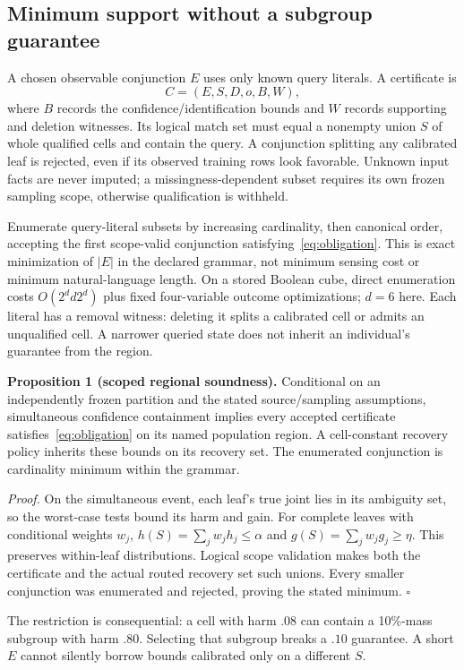 \documentclass[conference]{IEEEtran}
\begin{document}
\subsection{Minimum support without a subgroup guarantee}
A chosen observable conjunction $E$ uses only known query literals. A certificate is
\begin{equation}
 C=(E,S,D,o,B,W),\label{eq:certificate}
\end{equation}
where $B$ records the confidence/identification bounds and $W$ records supporting and deletion witnesses. Its logical match set must equal a nonempty union $S$ of whole qualified cells and contain the query. A conjunction splitting any calibrated leaf is rejected, even if its observed training rows look favorable. Unknown input facts are never imputed; a missingness-dependent subset requires its own frozen sampling scope, otherwise qualification is withheld.

Enumerate query-literal subsets by increasing cardinality, then canonical order, accepting the first scope-valid conjunction satisfying~\eqref{eq:obligation}. This is exact minimization of $|E|$ in the declared grammar, not minimum sensing cost or minimum natural-language length. On a stored Boolean cube, direct enumeration costs $O(2^d d2^d)$ plus fixed four-variable outcome optimizations; $d=6$ here. Each literal has a removal witness: deleting it splits a calibrated cell or admits an unqualified cell. A narrower queried state does not inherit an individual's guarantee from the region.

\textbf{Proposition 1 (scoped regional soundness).} Conditional on an independently frozen partition and the stated source/sampling assumptions, simultaneous confidence containment implies every accepted certificate satisfies~\eqref{eq:obligation} on its named population region. A cell-constant recovery policy inherits these bounds on its recovery set. The enumerated conjunction is cardinality minimum within the grammar.

\emph{Proof.} On the simultaneous event, each leaf's true joint lies in its ambiguity set, so the worst-case tests bound its harm and gain. For complete leaves with conditional weights $w_j$, $h(S)=\sum_jw_jh_j\leq\alpha$ and $g(S)=\sum_jw_jg_j\geq\eta$. This preserves within-leaf distributions. Logical scope validation makes both the certificate and the actual routed recovery set such unions. Every smaller conjunction was enumerated and rejected, proving the stated minimum. $\square$

The restriction is consequential: a cell with harm $.08$ can contain a 10\%-mass subgroup with harm $.80$. Selecting that subgroup breaks a $.10$ guarantee. A short $E$ cannot silently borrow bounds calibrated only on a different $S$.
\end{document}
